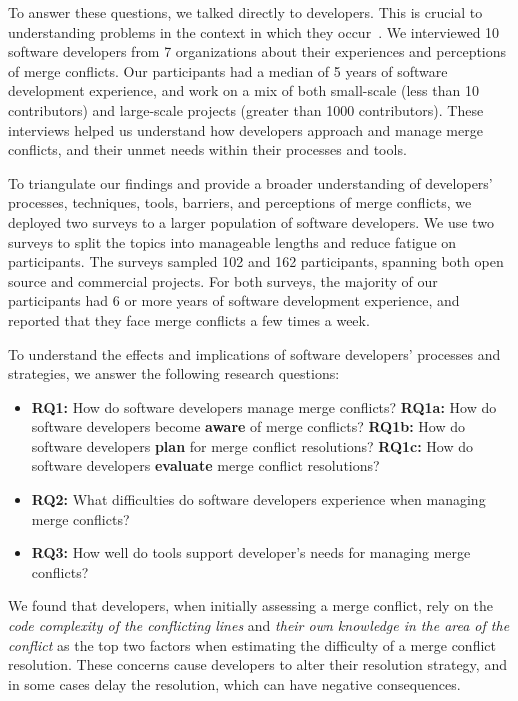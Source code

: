 To answer these questions, we talked directly to developers.
This is crucial to understanding problems in the context in which they occur~\cite{fritz2010using, sillito2006questions, ko2007information}.
We interviewed 10 software developers from 7 organizations about their experiences and perceptions of merge conflicts. %
Our participants had a median of 5 years of software development experience, and work on a mix of both small-scale (less than 10 contributors) and large-scale projects (greater than 1000 contributors).
These interviews helped us understand how developers approach and manage merge conflicts, and their unmet needs within their processes and tools.

To triangulate our findings and provide a broader understanding of developers' processes, techniques, tools, barriers, and perceptions of merge conflicts, we deployed two surveys to a larger population of software developers.
We use two surveys to split the topics into manageable lengths and reduce fatigue on participants.
The surveys sampled 102 and 162 participants, spanning both open source and commercial projects. 
For both surveys, the majority of our participants had 6 or more years of software development experience, and reported that they face merge conflicts a few times a week.

To understand the effects and implications of software developers' processes and strategies, we answer the following research questions:

\begin{itemize}[label=$\bullet$]
\item \textbf{RQ1:} How do software developers manage merge conflicts?
\subitem \textbf{RQ1a:} How do software developers become \textbf{aware} of merge conflicts?
\subitem \textbf{RQ1b:} How do software developers \textbf{plan} for merge conflict resolutions?
\subitem \textbf{RQ1c:} How do software developers \textbf{evaluate} merge conflict resolutions?
\item \textbf{RQ2:} What difficulties do software developers experience when managing merge conflicts?
\item \textbf{RQ3:} How well do tools support developer's needs for managing merge conflicts?
\end{itemize}

We found that developers, when initially assessing a merge conflict, rely on the \textit{code complexity of the conflicting lines} and \textit{their own knowledge in the area of the conflict} as the top two factors when estimating the difficulty of a merge conflict resolution.
These concerns cause developers to alter their resolution strategy, and in some cases delay the resolution, which can have negative consequences.

